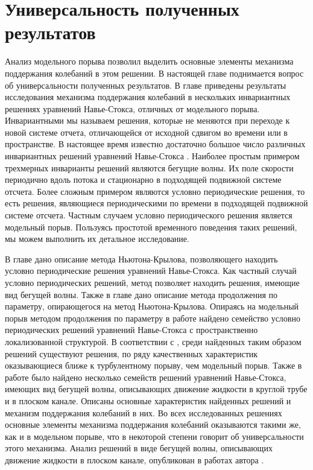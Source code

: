 
\chapter{Универсальность полученных результатов}

Анализ модельного порыва позволил выделить основные элементы механизма поддержания колебаний в этом решении. В настоящей главе поднимается вопрос об универсальности полученных результатов. В главе приведены результаты исследования механизма поддержания колебаний в нескольких инвариантных решениях уравнений Навье-Стокса, отличных от модельного порыва. Инвариантными мы называем решения, которые не меняются при переходе к новой системе отчета, отличающейся от исходной сдвигом во времени или в пространстве. В настоящее время известно достаточно большое число различных инвариантных решений уравнений Навье-Стокса \cite{Kawahara2012}. Наиболее простым примером трехмерных инварианты решений являются бегущие волны. Их поле скорости периодично вдоль потока и стационарно в подходящей подвижной системе отсчета. Более сложным примером являются условно периодические решения, то есть решения, являющиеся периодическими по времени в подходящей подвижной системе отсчета. Частным случаем условно периодического решения является модельный порыв. Пользуясь простотой временного поведения таких решений, мы можем выполнить их детальное исследование. 


В главе дано описание метода Ньютона-Крылова, позволяющего находить условно периодические решения уравнений Навье-Стокса. Как частный случай условно периодических решений, метод позволяет находить решения, имеющие вид бегущей волны. Также в главе дано описание метода продолжения по параметру, опирающегося на метод Ньютона-Крылова. Опираясь на модельный порыв методом продолжения по параметру в работе найдено семейство условно периодических решений уравнений Навье-Стокса с пространственно локализованной структурой. В соответствии с \cite{Avila2013}, среди найденных таким образом решений существуют решения, по ряду качественных характеристик оказывающиеся ближе к турбулентному порыву, чем модельный порыв.  Также в работе было найдено несколько семейств решений уравнений Навье-Стокса, имеющих вид бегущей волны, описывающих движение жидкости в круглой трубе и в плоском канале. Описаны основные характеристик найденных решений и механизм поддержания колебаний в них. Во всех исследованных решениях основные элементы механизма поддержания колебаний оказываются такими же, как и в модельном порыве, что в некоторой степени говорит об универсальности этого механизма. Анализ решений в виде бегущей волны, описывающих движение жидкости в плоском канале, опубликован в работах автора \cite{Vest18, KMU2016}. 


